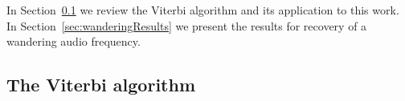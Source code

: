 \documentclass[paper-main.tex]{subfiles}
\begin{document}
In Section~\ref{sec:viterbi} we review the Viterbi algorithm and its application to this work. 
In Section~\ref{sec:wanderingResults} we present the results for recovery of a wandering audio frequency. 





\subsection{The Viterbi algorithm}
\label{sec:viterbi}
\end{document}

